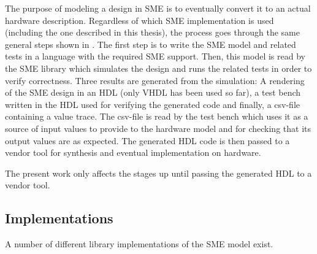 The purpose of modeling a design in SME is to eventually convert it to an actual
hardware description. Regardless of which SME implementation is used (including
the one described in this thesis), the process goes through the same general
steps shown in . The first step is to write the SME model and
related tests in a language with the required SME support. Then, this model is
read by the SME library which simulates the design and runs the related tests in
order to verify correctness. Three results are generated from the simulation: A
rendering of the SME design in an HDL (only VHDL has been used so far), a
test bench written in the HDL used for verifying the generated code and finally,
a \gls{csv}-file containing a value trace. The \gls{csv}-file is read by the
test bench which uses it as a source of input values to provide to the hardware
model and for checking that its output values are as expected. The generated HDL
code is then passed to a vendor tool for synthesis and eventual implementation
on hardware.

The present work only affects the stages up until passing the generated HDL to a
vendor tool.






\subsection{Implementations}
A number of different library implementations of the SME model exist.

